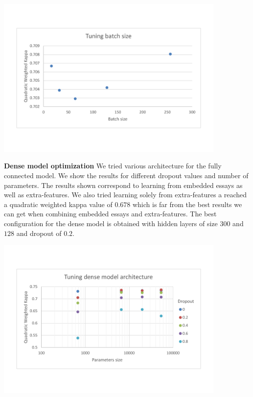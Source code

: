 \documentclass[a4paper,12pt,english]{article}
\begin{document}
\begin{center}
\vspace*{-1.5cm}
\includegraphics[width=0.85\textwidth]{fig/tune_bs.pdf}
\vspace*{-1.5cm}
\end{center}

\textbf{Dense model optimization} We tried various architecture for the fully connected model. We show the results for different dropout values and number of parameters. The results shown correspond to learning from embedded essays as well as extra-features. We also tried learning solely from extra-features a reached a quadratic weighted kappa value of $0.678$ which is far from the best results we can get when combining embedded essays and extra-features. The best configuration for the dense model is obtained with hidden layers of size $300$ and $128$ and dropout of $0.2$.

\begin{center}
\vspace*{-1.5cm}
\includegraphics[width=0.85\textwidth]{fig/tune_dense_arch.pdf}
\vspace*{-1.5cm}
\end{center}
\end{document}
